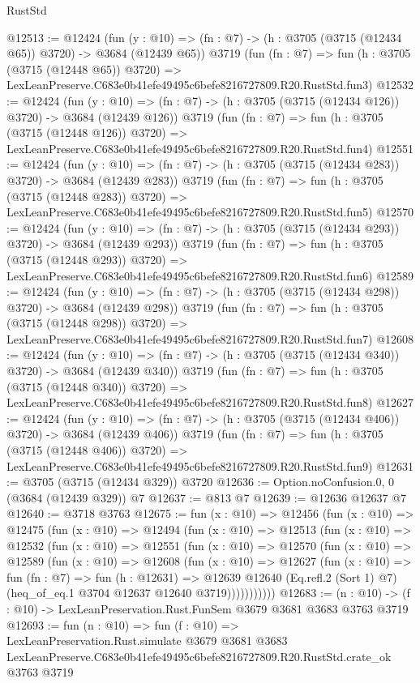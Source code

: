 \begin{lexlean}{RustStd}
\begin{coremodule}
@12513 := @12424
    (fun (y : @10) => (fn : @7) -> (h : @3705 (@3715 (@12434 @65)) @3720) -> @3684 (@12439 @65))
    @3719
    (fun (fn : @7) =>
    fun (h : @3705 (@3715 (@12448 @65)) @3720) =>
    LexLeanPreserve.C683e0b41efe49495c6befe8216727809.R20.RustStd.fun3)
@12532 := @12424
    (fun (y : @10) => (fn : @7) -> (h : @3705 (@3715 (@12434 @126)) @3720) -> @3684 (@12439 @126))
    @3719
    (fun (fn : @7) =>
    fun (h : @3705 (@3715 (@12448 @126)) @3720) =>
    LexLeanPreserve.C683e0b41efe49495c6befe8216727809.R20.RustStd.fun4)
@12551 := @12424
    (fun (y : @10) => (fn : @7) -> (h : @3705 (@3715 (@12434 @283)) @3720) -> @3684 (@12439 @283))
    @3719
    (fun (fn : @7) =>
    fun (h : @3705 (@3715 (@12448 @283)) @3720) =>
    LexLeanPreserve.C683e0b41efe49495c6befe8216727809.R20.RustStd.fun5)
@12570 := @12424
    (fun (y : @10) => (fn : @7) -> (h : @3705 (@3715 (@12434 @293)) @3720) -> @3684 (@12439 @293))
    @3719
    (fun (fn : @7) =>
    fun (h : @3705 (@3715 (@12448 @293)) @3720) =>
    LexLeanPreserve.C683e0b41efe49495c6befe8216727809.R20.RustStd.fun6)
@12589 := @12424
    (fun (y : @10) => (fn : @7) -> (h : @3705 (@3715 (@12434 @298)) @3720) -> @3684 (@12439 @298))
    @3719
    (fun (fn : @7) =>
    fun (h : @3705 (@3715 (@12448 @298)) @3720) =>
    LexLeanPreserve.C683e0b41efe49495c6befe8216727809.R20.RustStd.fun7)
@12608 := @12424
    (fun (y : @10) => (fn : @7) -> (h : @3705 (@3715 (@12434 @340)) @3720) -> @3684 (@12439 @340))
    @3719
    (fun (fn : @7) =>
    fun (h : @3705 (@3715 (@12448 @340)) @3720) =>
    LexLeanPreserve.C683e0b41efe49495c6befe8216727809.R20.RustStd.fun8)
@12627 := @12424
    (fun (y : @10) => (fn : @7) -> (h : @3705 (@3715 (@12434 @406)) @3720) -> @3684 (@12439 @406))
    @3719
    (fun (fn : @7) =>
    fun (h : @3705 (@3715 (@12448 @406)) @3720) =>
    LexLeanPreserve.C683e0b41efe49495c6befe8216727809.R20.RustStd.fun9)
@12631 := @3705 (@3715 (@12434 @329)) @3720
@12636 := Option.noConfusion.{0, 0} (@3684 (@12439 @329)) @7
@12637 := @813 @7
@12639 := @12636 @12637 @7
@12640 := @3718 @3763
@12675 := fun (x : @10) =>
  @12456
    (fun (x : @10) =>
    @12475
      (fun (x : @10) =>
      @12494
        (fun (x : @10) =>
        @12513
          (fun (x : @10) =>
          @12532
            (fun (x : @10) =>
            @12551
              (fun (x : @10) =>
              @12570
                (fun (x : @10) =>
                @12589
                  (fun (x : @10) =>
                  @12608
                    (fun (x : @10) =>
                    @12627
                      (fun (x : @10) =>
                      fun (fn : @7) =>
                      fun (h : @12631) =>
                      @12639
                        @12640
                        (Eq.refl.{2} (Sort 1) @7)
                        (heq_of_eq.{1} @3704 @12637 @12640 @3719)))))))))))
@12683 := (n : @10) -> (f : @10) -> LexLeanPreservation.Rust.FunSem @3679 @3681 @3683 @3763 @3719
@12693 := fun (n : @10) =>
  fun (f : @10) =>
  LexLeanPreservation.Rust.simulate
    @3679
    @3681
    @3683
    LexLeanPreserve.C683e0b41efe49495c6befe8216727809.R20.RustStd.crate_ok
    @3763
    @3719
\end{coremodule}
\end{lexlean}
